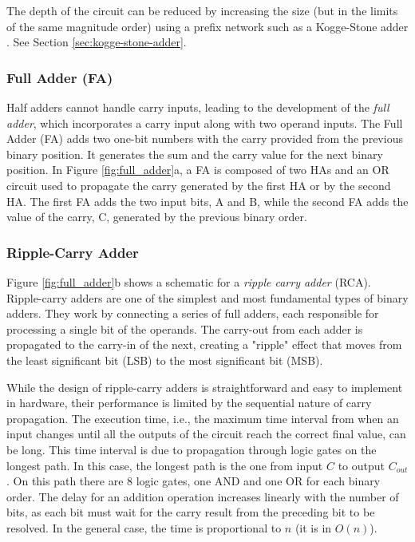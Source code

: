 The depth of the circuit can be reduced by increasing the size (but in the limits of the same magnitude order) using a prefix network such as a Kogge-Stone adder \cite{kogge1973parallel}. See Section \ref{sec:kogge-stone-adder}.

\subsubsection{Full Adder (FA)}
Half adders cannot handle carry inputs, leading to the development of the \textit{full adder}, which incorporates a carry input along with two operand inputs. The Full Adder (FA) adds two one-bit numbers with the carry provided from the previous binary position. It generates the sum and the carry value for the next binary position. In Figure \ref{fig:full_adder}a, a FA is composed of two HAs and an OR circuit used to propagate the carry generated by the first HA or by the second HA. The first FA adds the two input bits, A and B, while the second FA adds the value of the carry, C, generated by the previous binary order.


\subsubsection{Ripple-Carry Adder} \label{sec:ripple-carry-adder}
Figure \ref{fig:full_adder}b shows a schematic for a \textit{ripple carry adder} (RCA). Ripple-carry adders are one of the simplest and most fundamental types of binary adders. They work by connecting a series of full adders, each responsible for processing a single bit of the operands. The carry-out from each adder is propagated to the carry-in of the next, creating a "ripple" effect that moves from the least significant bit (LSB) to the most significant bit (MSB). 

While the design of ripple-carry adders is straightforward and easy to implement in hardware, their performance is limited by the sequential nature of carry propagation. The execution time, i.e., the maximum time interval from when an input changes until all the outputs of the circuit reach the correct final value, can be long. This time interval is due to propagation through logic gates on the longest path. In this case, the longest path is the one from input $C$ to output $C_{out}$. On this path there are 8 logic gates, one AND and one OR for each binary order. The delay for an addition operation increases linearly with the number of bits, as each bit must wait for the carry result from the preceding bit to be resolved. In the general case, the time is proportional to $n$ (it is in $O(n)$). 

